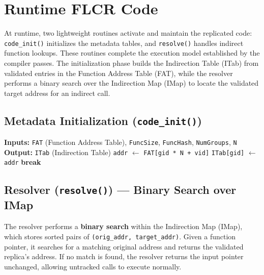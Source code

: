 \ifshowflcrpass
  
  \clearpage
\fi
\section*{Runtime FLCR Code}

At runtime, two lightweight routines activate and maintain the replicated code:
\texttt{code\_init()} initializes the metadata tables, and \texttt{resolve()}
handles indirect function lookups. These routines complete the execution model
established by the compiler passes. The initialization phase builds the Indirection
Table (ITab) from validated entries in the Function Address Table (FAT), while the
resolver performs a binary search over the Indirection Map (IMap) to locate the
validated target address for an indirect call.

\subsection*{Metadata Initialization (\texttt{code\_init()})}
\begin{algorithm}[H]
\caption{\texttt{code\_init} — Populate Indirection Table (ITab) from FAT}
\label{alg:code-init-itab}
\begin{algorithmic}[1]
\State \textbf{Inputs:} \texttt{FAT} (Function Address Table), \texttt{FuncSize}, \texttt{FuncHash}, \texttt{NumGroups}, \texttt{N}
\State \textbf{Output:} \texttt{ITab} (Indirection Table)
    \State \texttt{addr} $\gets$ \texttt{FAT[gid * N + vid]}
      \State \texttt{ITab[gid]} $\gets$ \texttt{addr}
      \State \textbf{break}
    \EndIf
  \EndFor
\EndFor
\end{algorithmic}
\end{algorithm}

\subsection*{Resolver (\texttt{resolve()}) — Binary Search over IMap}
\noindent
The resolver performs a \textbf{binary search} within the Indirection Map (IMap),
which stores sorted pairs of \texttt{(orig\_addr, target\_addr)}.  
Given a function pointer, it searches for a matching original address and returns
the validated replica’s address. If no match is found, the resolver returns the
input pointer unchanged, allowing untracked calls to execute normally.

